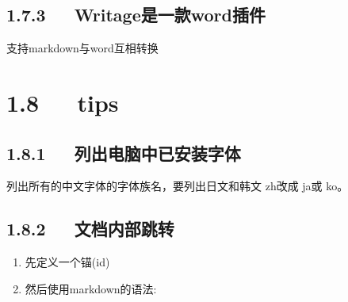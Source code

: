 \documentclass[letterpaper,12pt,english]{sphinxmanual}
\begin{document}
\subsection{1.7.3   Writage是一款word插件}
\label{\detokenize{001software/001install/pandoc:writageword}}
 支持markdown与word互相转换


\section{1.8   tips}
\label{\detokenize{001software/001install/pandoc:tips-1}}\label{\detokenize{001software/001install/pandoc:id11}}

\subsection{1.8.1   列出电脑中已安装字体}
\label{\detokenize{001software/001install/pandoc:id12}}
列出所有的中文字体的字体族名，要列出日文和韩文 zh改成 ja或 ko。

\begin{sphinxVerbatim}[commandchars=\\\{\}]
     
\end{sphinxVerbatim}


\subsection{1.8.2   文档内部跳转}
\label{\detokenize{001software/001install/pandoc:id13}}\begin{enumerate}
%
\item {} 
先定义一个锚(id)

\begin{sphinxVerbatim}[commandchars=\\\{\}]
  
\end{sphinxVerbatim}

\item {} 
然后使用markdown的语法:

\begin{sphinxVerbatim}[commandchars=\\\{\}]
\PYG{p}{[}\PYG{p}{]}
\end{sphinxVerbatim}

\end{enumerate}
\end{document}
